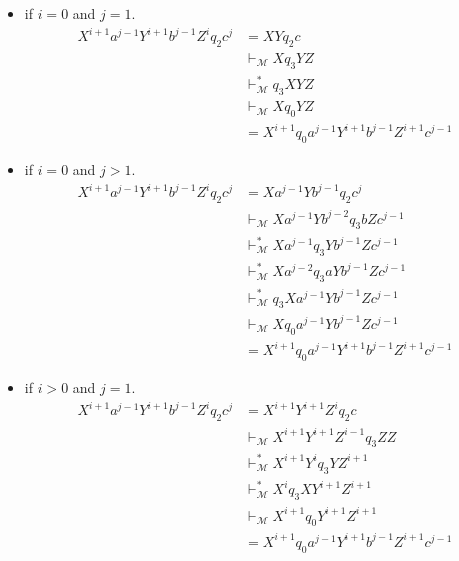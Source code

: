 \documentclass[12pt]{article}
\begin{document}
\begin{itemize}
  \item if \(i = 0\) and \(j = 1\).
  \begin{align*}
    X^{i+1}a^{j-1}Y^{i+1}b^{j-1}Z^iq_2c^j &= XYq_2c \\
    & \vdash_\mathcal{M} Xq_3YZ \tag*{(transition from \(q_2\) to \(q_3\))}\\
    & \vdash^{*}_\mathcal{M} q_3XYZ \tag*{(L3 by taking \(x = Y\))}\\
    & \vdash_\mathcal{M} Xq_0YZ \tag*{(transition from \(q_3\) to \(q_0\))}\\
    &= X^{i+1}q_0a^{j-1}Y^{i+1}b^{j-1}Z^{i+1}c^{j-1}
  \end{align*}
  \item if \(i = 0\) and \(j > 1\).
  \begin{align*}
    X^{i+1}a^{j-1}Y^{i+1}b^{j-1}Z^iq_2c^j &= Xa^{j-1}Yb^{j-1}q_2c^j \\
    & \vdash_\mathcal{M} Xa^{j-1}Yb^{j-2}q_3bZc^{j-1} \tag*{(transition from \(q_2\) to \(q_3\))}\\
    & \vdash^{*}_\mathcal{M} Xa^{j-1}q_3Yb^{j-1}Zc^{j-1} \tag*{(L3 by taking x = b)}\\
    & \vdash^{*}_\mathcal{M} Xa^{j-2}q_3aYb^{j-1}Zc^{j-1} \tag*{(L3 by taking x = Y)}\\
    & \vdash^{*}_\mathcal{M} q_3Xa^{j-1}Yb^{j-1}Zc^{j-1} \tag*{(L3 by taking x = a)}\\
    & \vdash_\mathcal{M} Xq_0a^{j-1}Yb^{j-1}Zc^{j-1} \tag*{(transition from \(q_3\) to \(q_0\))}\\
    &= X^{i+1}q_0a^{j-1}Y^{i+1}b^{j-1}Z^{i+1}c^{j-1}
  \end{align*}
  \item if \(i > 0\) and \(j = 1\).
  \begin{align*}
    X^{i+1}a^{j-1}Y^{i+1}b^{j-1}Z^iq_2c^j &= X^{i+1}Y^{i+1}Z^iq_2c \\
    & \vdash_\mathcal{M} X^{i+1}Y^{i+1}Z^{i-1}q_3ZZ \tag*{(transition from \(q_2\) to \(q_3\))}\\
    & \vdash^{*}_\mathcal{M} X^{i+1}Y^iq_3YZ^{i+1} \tag*{(L3 by taking x = Z)}\\
    & \vdash^{*}_\mathcal{M} X^iq_3XY^{i+1}Z^{i+1} \tag*{(L3 by taking x = Y)}\\
    & \vdash_\mathcal{M} X^{i+1}q_0Y^{i+1}Z^{i+1} \tag*{(transition from \(q_3\) to \(q_0\))}\\
    &= X^{i+1}q_0a^{j-1}Y^{i+1}b^{j-1}Z^{i+1}c^{j-1}
  \end{align*}

\end{itemize}
\end{document}
